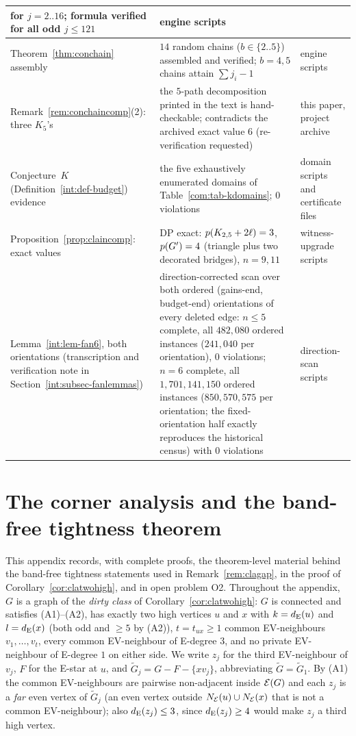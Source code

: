 \begin{longtable}{p{4.6cm} p{6.2cm} p{4.2cm}}
for $j=2..16$; formula verified for all odd $j\le121$ & engine scripts\\
\hline
Theorem~\ref{thm:conchain} assembly & $14$ random chains
($b\in\{2..5\}$) assembled and verified; $b=4,5$ chains attain
$\sum j_i-1$ & engine scripts\\
\hline
Remark~\ref{rem:conchaincomp}(2): three $K_5$'s & the $5$-path
decomposition printed in the text is hand-checkable; contradicts the
archived exact value $6$ (re-verification requested) & this paper, project
archive\\
\hline
Conjecture~$K$ (Definition~\ref{int:def-budget}) evidence & the five
exhaustively enumerated domains of Table~\ref{com:tab-kdomains}; $0$
violations & domain scripts and certificate files\\
\hline
Proposition~\ref{prop:claincomp}: exact values & DP exact:
$p(K_{2,5}+2\ell)=3$, $p(G')=4$ (triangle plus two decorated
bridges), $n=9,11$ & witness-upgrade scripts\\
\hline
Lemma~\ref{int:lem-fan6}, both orientations (transcription and
verification note in Section~\ref{int:subsec-fanlemmas}) &
direction-corrected scan over both ordered (gains-end, budget-end)
orientations of every deleted edge: $n\le5$ complete, all $482{,}080$
ordered instances ($241{,}040$ per orientation), $0$ violations; $n=6$
complete, all $1{,}701{,}141{,}150$ ordered instances ($850{,}570{,}575$
per orientation; the fixed-orientation half exactly reproduces the
historical census) with $0$ violations & direction-scan scripts\\
\hline
\end{longtable}
\endgroup

\section{The corner analysis and the band-free tightness theorem}
\label{com:app-band}

This appendix records, with complete proofs, the theorem-level material
behind the band-free tightness statements used in
Remark~\ref{rem:clagap}, in the proof of Corollary~\ref{cor:clatwohigh},
and in open problem O2. Throughout the appendix, $G$ is a graph of the
\emph{dirty class} of Corollary~\ref{cor:clatwohigh}: $G$ is connected
and satisfies {\rm(A1)}--{\rm(A2)}, has exactly two high vertices $u$ and
$x$ with $k=d_{\mathrm{E}}(u)$ and $l=d_{\mathrm{E}}(x)$ (both odd and $\ge5$ by (A2)),
$t=t_{ux}\ge1$ common EV-neighbours $v_1,\dots,v_t$, every common
EV-neighbour of E-degree $3$, and no private EV-neighbour of E-degree $1$
on either side. We write $z_j$ for the third EV-neighbour of $v_j$, $F$
for the E-star at $u$, and $\tilde G_j=G-F-\{xv_j\}$, abbreviating
$\tilde G=\tilde G_1$. By (A1) the common EV-neighbours are pairwise
non-adjacent inside $\mathcal{E}(G)$ and each $z_j$ is a \emph{far} even vertex
of $\tilde G_j$ (an even vertex outside $N_{\mathcal{E}}(u)\cup N_{\mathcal{E}}(x)$ that
is not a common EV-neighbour); also $d_{\mathrm{E}}(z_j)\le3$, since
$d_{\mathrm{E}}(z_j)\ge4$ would make $z_j$ a third high vertex.

